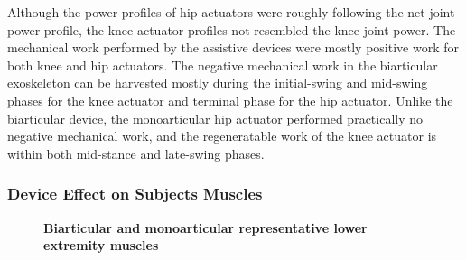 \documentclass[10pt,letterpaper]{article}
\begin{document}
Although the power profiles of hip actuators were roughly following the net joint power profile, the knee actuator profiles not resembled the knee joint power. The mechanical work performed by the assistive devices were mostly positive work for both knee and hip actuators. The negative mechanical work in the biarticular exoskeleton can be harvested mostly during the initial-swing and mid-swing phases for the knee actuator and terminal phase for the hip actuator. Unlike the biarticular device, the monoarticular hip actuator performed practically no negative mechanical work, and the regeneratable work of the knee actuator is within both mid-stance and late-swing phases.
\subsubsection*{Device Effect on Subjects Muscles}
\begin{figure}[ht!]
	\centering
	\hfil
	\vspace{1mm}
	\caption{\small{\textbf{Biarticular and monoarticular representative lower extremity muscles}}}
	\label{Fig_Muscles}
\end{figure}
\end{document}
